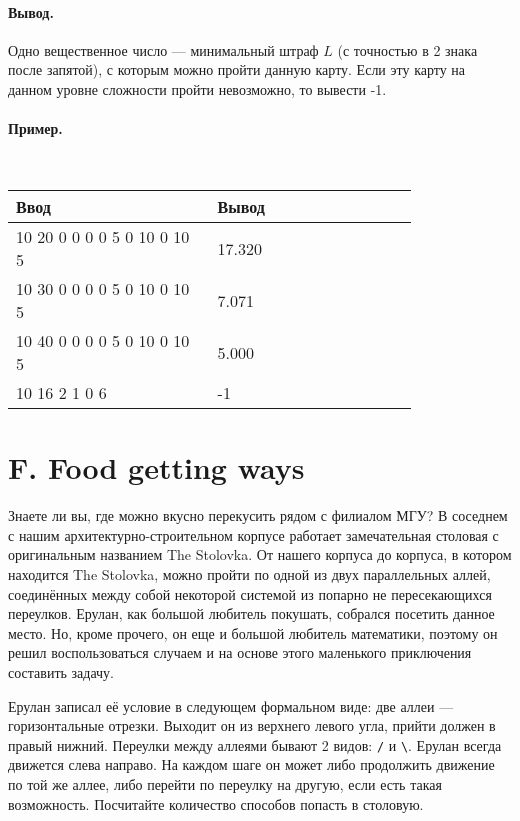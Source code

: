 \documentclass[10pt, a5paper]{article}
\newcommand{\outformat}[1]
{
	\paragraph{Вывод.\\} #1
}
\newcommand{\exampleeee}[8]
{
	\paragraph{Пример.\\}
	{\tt
	\begin{tabular}{|p{0.4\linewidth}|p{0.4\linewidth}|}
	\hline
	Ввод 	& Вывод  	\\
	\hline
	#1 		& #2 		\\
	\hline
	#3		& #4		\\
	\hline
	#5		& #6		\\
	\hline
	#7		& #8		\\
	\hline
	\end{tabular}
	}
}
\begin{document}
\outformat{Одно вещественное число --- минимальный штраф $L$ (с точностью в 2 знака после запятой), с которым можно пройти данную карту. Если эту карту на данном уровне сложности пройти невозможно, то вывести -1.}

\exampleeee{
10 20 \newline
5 \newline
5 0 0 \newline
10 0 0 \newline
10 5 0 \newline
10 10 0 \newline
10 10 5}
{17.320}
{10 30 \newline
5 \newline
5 0 0 \newline
10 0 0 \newline
10 5 0 \newline
10 10 0 \newline
10 10 5}
{7.071}
{10 40 \newline
5 \newline
5 0 0 \newline
10 0 0 \newline
10 5 0 \newline
10 10 0 \newline
10 10 5}
{5.000}
{10 16 \newline
2 \newline
6 2 1 \newline
4 0 6}
{-1}



\section*{F. Food getting ways}

Знаете ли вы, где можно вкусно перекусить рядом с филиалом МГУ? В соседнем с нашим архитектурно\--строительном корпусе работает замечательная столовая с оригинальным названием The Stolovka. От нашего корпуса до корпуса, в котором находится The Stolovka, можно пройти по одной из двух параллельных аллей, соединённых между собой некоторой системой из попарно не пересекающихся переулков. Ерулан, как большой любитель покушать, собрался посетить данное место. Но, кроме прочего, он еще и большой любитель математики, поэтому он решил воспользоваться случаем и на основе этого маленького приключения составить задачу. 




Ерулан записал её условие в следующем формальном виде: две аллеи --- горизонтальные отрезки. Выходит он из верхнего левого угла, прийти должен в правый нижний. Переулки между аллеями бывают 2 видов: {\tt /} и {\tt \textbackslash}. Ерулан всегда движется слева направо. На каждом шаге он может либо продолжить движение по той же аллее, либо перейти по переулку на другую, если есть такая возможность. Посчитайте количество способов попасть в столовую.
\end{document}
